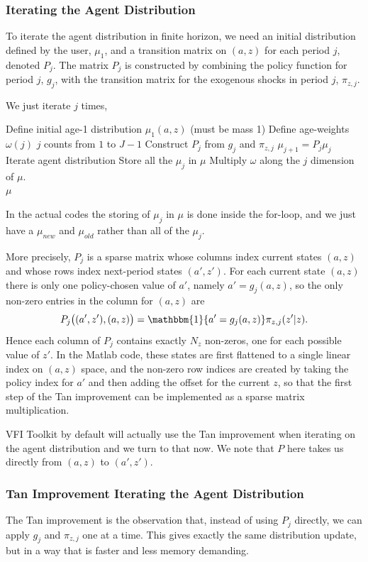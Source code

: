 \subsubsection{Iterating the Agent Distribution}
To iterate the agent distribution in finite horizon, we need an initial distribution defined by the user, $\mu_1$, and a transition matrix on $(a,z)$ for each period $j$, denoted $P_j$. The matrix $P_j$ is constructed by combining the policy function for period $j$, $g_j$, with the transition matrix for the exogenous shocks in period $j$, $\pi_{z,j}$.

We just iterate $j$ times,
\begin{algorithmic}
 \State Define initial age-1 distribution $\mu_1(a,z)$ (must be mass 1)
 \State Define age-weights $\omega(j)$
 \For $j$ counts from $1$ to $J-1$
  \State Construct $P_j$ from $g_j$ and $\pi_{z,j}$
  \State $\mu_{j+1}=P_j \mu_j$ \Comment Iterate agent distribution
 \EndFor
 \State Store all the $\mu_j$ in $\mu$
  \State Multiply $\omega$ along the $j$ dimension of $\mu$.
 \\ \Return $\mu$
 \end{algorithmic}
In the actual codes the storing of $\mu_j$ in $\mu$ is done inside the for-loop, and we just have a $\mu_{new}$ and $\mu_{old}$ rather than all of the $\mu_j$.

More precisely, $P_j$ is a sparse matrix whose columns index current states $(a,z)$ and whose rows index next-period states $(a',z')$. For each current state $(a,z)$ there is only one policy-chosen value of $a'$, namely $a'=g_j(a,z)$, so the only non-zero entries in the column for $(a,z)$ are
\[
P_j\big((a',z'),(a,z)\big)=\mathbbm{1}\{a'=g_j(a,z)\}\pi_{z,j}(z'|z).
\]
Hence each column of $P_j$ contains exactly $N_z$ non-zeros, one for each possible value of $z'$. In the Matlab code, these states are first flattened to a single linear index on $(a,z)$ space, and the non-zero row indices are created by taking the policy index for $a'$ and then adding the offset for the current $z$, so that the first step of the Tan improvement can be implemented as a sparse matrix multiplication.

VFI Toolkit by default will actually use the Tan improvement when iterating on the agent distribution and we turn to that now. We note that $P$ here takes us directly from $(a,z)$ to $(a',z')$.

\subsubsection{Tan Improvement Iterating the Agent Distribution}
The Tan improvement is the observation that, instead of using $P_j$ directly, we can apply $g_j$ and $\pi_{z,j}$ one at a time. This gives exactly the same distribution update, but in a way that is faster and less memory demanding.

